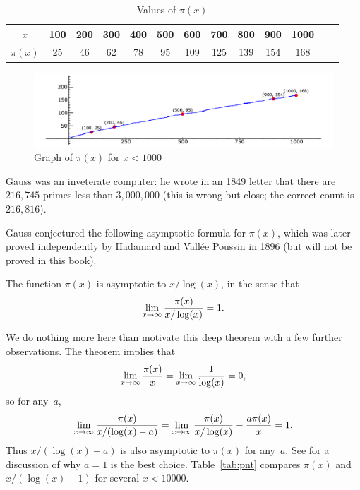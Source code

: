 \begin{table}
\caption{Values of $\pi(x)$\label{tab:primes}}\vspace{1ex}
\begin{center}
\begin{tabular}{|c|c|c|c|c|c|c|c|c|c|c|c|c|}\hline
$x$ & 100 & 200 & 300 & 400 & 500 & 600 & 700 & 800 & 900 &1000\\\hline
$\pi(x)$ & 25&46&62&78&95&109&125&139&154&168\\\hline
\end{tabular}
\end{center}
\end{table}

\begin{figure}
\includegraphics[width=\textwidth]{graphics/prime_pi}
\caption{Graph of $\pi(x)$ for $x<1000$}\label{fig:pix}
\end{figure}

Gauss was an inveterate computer:
he wrote in an 1849 letter that there are
$216,745$ primes less than $3,000,000$ (this is wrong but close;
the correct count is $216,816$).

Gauss conjectured the following asymptotic formula for $\pi(x)$, which was
later proved independently by Hadamard and Vall\'ee
Poussin in 1896 (but will not be proved in
this book).
\begin{theorem}\label{thm:primenumber}
The function $\pi(x)$ is asymptotic to $x/\log(x)$, in the sense that
   $$\lim_{x\rightarrow \infty}  \frac{\pi(x)}{ x/\log(x)} = 1.$$
\end{theorem}
We do nothing more here than motivate this deep theorem with
a few further observations.
The theorem implies that
$$\lim_{x\rightarrow \infty} \frac{\pi(x)}{x}  = \lim_{x\rightarrow \infty} \frac{1}{\log(x)} =0,$$
so for any~$a$,
$$\lim_{x\rightarrow\infty} \frac{\pi(x)}{x/(\log(x)-a)} =
    \lim_{x\rightarrow\infty} \frac{\pi(x)}{x/\log(x)} - \frac{a\pi(x)}{x}
          = 1.$$
Thus $x/(\log(x)-a)$ is also asymptotic to $\pi(x)$ for
any~$a$.  See \cite[\S1.1.5]{primenumbers} for a discussion of why
$a=1$ is the best choice.  Table~\ref{tab:pnt} compares
$\pi(x)$ and $x/(\log(x)-1)$ for several $x<10000$.


